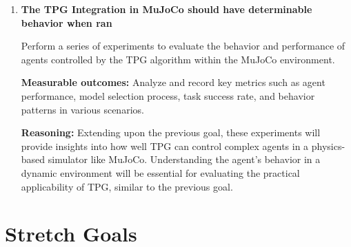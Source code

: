 \documentclass{article}
\begin{document}
\begin{enumerate} [leftmargin=*]
\textbf{Measurable Outcomes:
} To accomplish this goal,  the TPG framework should contain a fully functional interface for a basic agent (e.g., a program that controls a simple joint robotic arm) in MuJoCo. By the end of the project, this can be further expanded to having the interface to support more complex agents.

\textbf{Reasoning:} This interface will enable the TPG framework to be tested in more realistic and complex environments. Successful integration with MuJoCo will validate TPG’s performance in a cutting-edge robotics simulator, essential for showcasing its real-world capabilities. Furthermore, the current testing environment for TPG is stationary (all states are known/given), and integrating with Mujoco enables for testing with dynamic environments, where the agents will have to change over time.


\item \textbf{The TPG Integration in MuJoCo should have determinable behavior when ran}

Perform a series of experiments to evaluate the behavior and performance of agents controlled by the TPG algorithm within the MuJoCo environment.

\textbf{Measurable outcomes:} Analyze and record key metrics such as agent performance, model selection process, task success rate, and behavior patterns in various scenarios. 

\textbf{Reasoning:} Extending upon the previous goal, these experiments will provide insights into how well TPG can control complex agents in a physics-based simulator like MuJoCo. Understanding the agent’s behavior in a dynamic environment will be essential for evaluating the practical applicability of TPG, similar to the previous goal. 


\end{enumerate}




\section{Stretch Goals}
\end{document}
